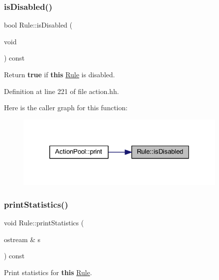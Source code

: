 \subsubsection{\texorpdfstring{isDisabled()}{isDisabled()}}
{\footnotesize\ttfamily bool Rule\+::is\+Disabled (\begin{DoxyParamCaption}\item[{void}]{ }\end{DoxyParamCaption}) const\hspace{0.3cm}{\ttfamily [inline]}}



Return {\bfseries{true}} if {\bfseries{this}} \mbox{\hyperlink{class_rule}{Rule}} is disabled. 



Definition at line 221 of file action.\+hh.

Here is the caller graph for this function\+:
\nopagebreak
\begin{figure}[H]
\begin{center}
\leavevmode
\includegraphics[width=292pt]{class_rule_a8e55ac34d63aaff7668c1f60cb2d1756_icgraph}
\end{center}
\end{figure}
\mbox{\label{class_rule_a80e0ad50a132df1b33b7705ccdea01b3}} 
\subsubsection{\texorpdfstring{printStatistics()}{printStatistics()}}
{\footnotesize\ttfamily void Rule\+::print\+Statistics (\begin{DoxyParamCaption}\item[{ostream \&}]{s }\end{DoxyParamCaption}) const\hspace{0.3cm}{\ttfamily [virtual]}}



Print statistics for {\bfseries{this}} \mbox{\hyperlink{class_rule}{Rule}}. 

